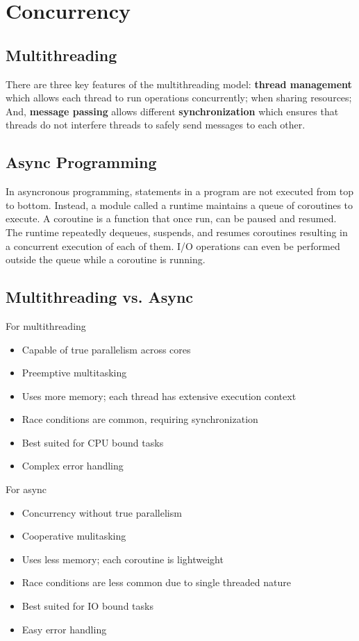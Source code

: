\section{Concurrency}
\subsection*{Multithreading}
There are three key features of the multithreading model: \textbf{thread
management} which allows each thread to run operations concurrently;
when sharing resources; And, \textbf{message passing} allows different
\textbf{synchronization} which ensures that threads do not interfere
threads to safely send messages to each other.

\subsection*{Async Programming}
In asyncronous programming, statements in a program are not executed
from top to bottom. Instead, a module called a runtime maintains a queue
of coroutines to execute. A coroutine is a function that once run, can
be paused and resumed. The runtime repeatedly dequeues, suspends, and
resumes coroutines resulting in a concurrent execution of each of them.
I/O operations can even be performed outside the queue while a coroutine
is running.

\subsection*{Multithreading vs. Async}
For multithreading
\begin{itemize}
  \item Capable of true parallelism across cores
  \item Preemptive multitasking
  \item Uses more memory; each thread has extensive execution context
  \item Race conditions are common, requiring synchronization
  \item Best suited for CPU bound tasks
  \item Complex error handling
\end{itemize}
For async
\begin{itemize}
  \item Concurrency without true parallelism
  \item Cooperative mulitasking
  \item Uses less memory; each coroutine is lightweight
  \item Race conditions are less common due to single threaded nature
  \item Best suited for IO bound tasks
  \item Easy error handling
\end{itemize}

